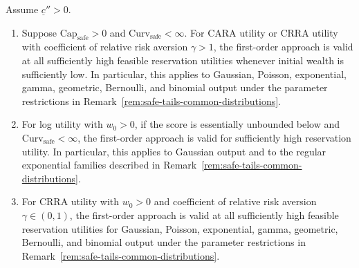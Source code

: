 \begin{corollary}
\label{cor:common-utilities}
Assume $\underline c''>0$.
\begin{enumerate}
    \renewcommand{\labelenumi}{(\roman{enumi})}
    \item Suppose $\mathrm{Cap}_{\mathrm{safe}}>0$ and
    $\mathrm{Curv}_{\mathrm{safe}}<\infty$.  For CARA utility or CRRA utility
    with coefficient of relative risk aversion $\gamma>1$, the first-order
    approach is valid at all sufficiently high feasible reservation utilities
    whenever initial wealth is sufficiently low.  In particular, this applies
    to Gaussian, Poisson, exponential, gamma, geometric, Bernoulli, and binomial
    output under the parameter restrictions in Remark~\ref{rem:safe-tails-common-distributions}.

    \item For log utility with $w_0>0$, if the score is essentially unbounded
    below and $\mathrm{Curv}_{\mathrm{safe}}<\infty$, the first-order approach
    is valid for sufficiently high reservation utility.  In particular, this
    applies to Gaussian output and to the regular exponential
    families described in Remark~\ref{rem:safe-tails-common-distributions}.

    \item For CRRA utility with $w_0>0$ and coefficient of relative risk
    aversion $\gamma\in(0,1)$, the first-order approach is
    valid at all sufficiently high feasible reservation utilities for Gaussian,
    Poisson, exponential, gamma, geometric, Bernoulli, and binomial output under
    the parameter restrictions in Remark~\ref{rem:safe-tails-common-distributions}.
\end{enumerate}
\end{corollary}

